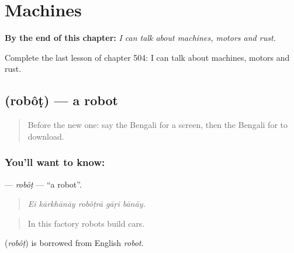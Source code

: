 
\chapter{Machines}
\label{ch:bn-machines}

\begin{chapteropening}
\textbf{By the end of this chapter:} \emph{I can talk about machines, motors and rust.}

Complete the last lesson of chapter 504: I can talk about machines, motors and rust.
\end{chapteropening}

\section[\texorpdfstring{\bn{রোবট} (robôṭ)}{রোবট (robôṭ)}]{ (robôṭ) — a robot}

\label{lesson:BN-C504-robot}



\begin{quote}
Before the new one: say the Bengali for a screen, then the Bengali for to download.
\end{quote}

\subsection*{You'll want to know: }
\textbf{} — \emph{robôṭ} — \textquotedblleft{}a robot\textquotedblright{}.

\begin{quote}
    
\end{quote}

\begin{quote}
\emph{Ei kārkhānāy robôṭrā gāṛi bānāy.}
\end{quote}

\begin{quote}
In this factory robots build cars.
\end{quote}

\begin{cousinweb}
\textbf{} (\emph{robôṭ}) is borrowed from English \emph{robot}.
\end{cousinweb}

